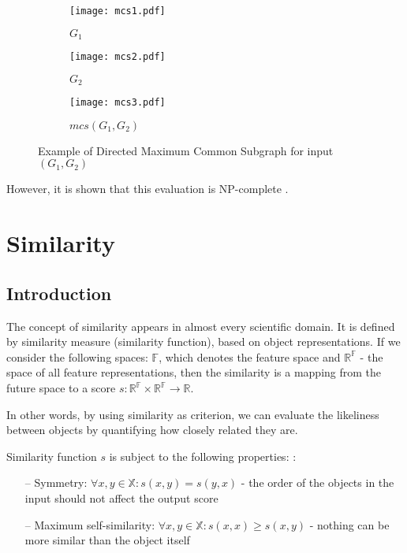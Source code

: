 \begin{figure}[t]
	\begin{subfigure}{.3\textwidth}
		\centering
		\texttt{[image: mcs1.pdf]}
		\caption{$G_{1}$}
		\label{fig:mcs1}
	\end{subfigure}%
	\begin{subfigure}{.3\textwidth}
		\centering
		\texttt{[image: mcs2.pdf]}
		\caption{$G_{2}$}
		\label{fig:mcs2}
	\end{subfigure}
\begin{subfigure}{.3\textwidth}
	\centering
	\texttt{[image: mcs3.pdf]}
	\caption{$mcs(G_{1},G_{2})$}
	\label{fig:mcs3}
\end{subfigure}
	\caption{Example of Directed Maximum Common Subgraph for input $(G_{1},G_{2})$ }
	\label{fig:mcs}
\end{figure}
 
 However, it is shown that this evaluation is NP-complete .

\section{Similarity}
\subsection{Introduction}
The concept of similarity appears in almost every scientific domain. 
It is defined by similarity measure (similarity function), based on object representations.
If we consider the following spaces: $\mathds{F}$, which denotes the feature space
and $\mathds{R} ^  \mathds{F}$ - the space of all feature representations,
then the similarity is a mapping from the future space to a score 
$s: \mathds{R}^{\mathds{F}} \times  \mathds{R}^{\mathds{F}} \rightarrow  \mathds{R}$.

In other words, by using similarity as criterion, we can evaluate the likeliness between objects by quantifying how closely related they are.


Similarity function $s$ is subject to the following properties: \cite{Santini:1999:SM:317043.317048}:

\begin{itemize}
	\item[--] Symmetry: $\forall x,y \in \mathds{X}: s(x,y) = s(y,x)$ - the order of the objects in the input should not affect the output score
	\item[--] Maximum self-similarity: $\forall x,y \in \mathds{X}: s(x,x) \geqslant s(x,y)$ - nothing can be more similar than the object itself
\end{itemize}

